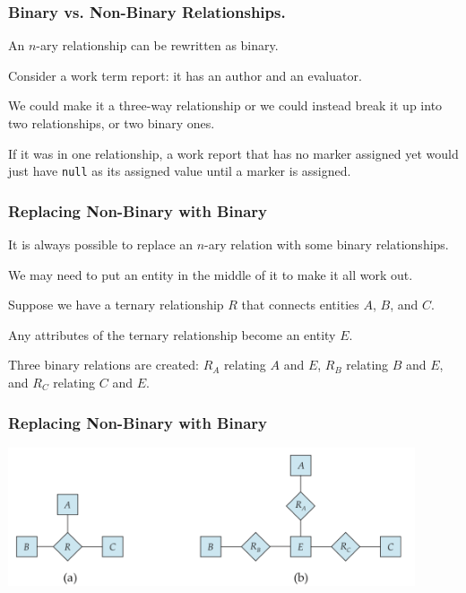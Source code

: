\begin{frame}
\frametitle{Binary vs. Non-Binary Relationships.}

An $n$-ary relationship can be rewritten as binary.

Consider a work term report: it has an author and an evaluator. 

We could make it a three-way relationship or we could instead break it up into two relationships, or two binary ones.

If it was in one relationship, a work report that has no marker assigned yet would just have \texttt{null} as its assigned value until a marker is assigned.  


\end{frame}



\begin{frame}
\frametitle{Replacing Non-Binary with Binary}

It is always possible to replace an $n$-ary relation with some binary relationships. 

We may need to put an entity in the middle of it to make it all work out.

 Suppose we have a ternary relationship $R$ that connects entities $A$, $B$, and $C$. 
 
 Any attributes of the ternary relationship become an entity $E$. 
 
Three binary relations are created: $R_{A}$ relating $A$ and $E$, $R_{B}$ relating $B$ and $E$, and $R_{C}$ relating $C$ and $E$.


\end{frame}



\begin{frame}
\frametitle{Replacing Non-Binary with Binary}

\begin{center}
\includegraphics[width=0.9\textwidth]{images/ternary-to-binary}
\end{center}

\end{frame}



